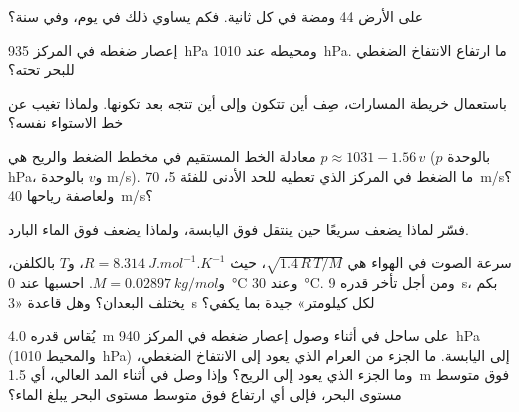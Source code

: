 \begin{exercise}[$\star\star$]\label{exo:g10:storms-and-cyclones:7}
على الأرض 44 ومضة  في كل ثانية. فكم يساوي ذلك في يوم، وفي
سنة؟
\end{exercise}

\begin{exercise}[$\star\star$]\label{exo:g10:storms-and-cyclones:8}
إعصار ضغطه في المركز \qty{935}{hPa} ومحيطه عند
\qty{1010}{hPa}. ما ارتفاع الانتفاخ الضغطي للبحر تحته؟
\end{exercise}

\begin{exercise}[$\star\star$]\label{exo:g10:storms-and-cyclones:9}
باستعمال خريطة المسارات، صِف أين تتكون  وإلى أين تتجه بعد
تكونها. ولماذا تغيب عن خط الاستواء نفسه؟
\end{exercise}

\begin{exercise}[$\star\star$]\label{exo:g10:storms-and-cyclones:10}
معادلة الخط المستقيم في مخطط الضغط والريح هي $p \approx 1031 - 1.56\,v$
($p$ بالوحدة \unit{hPa}، و$v$ بالوحدة \unit{m/s}). ما الضغط في المركز الذي تعطيه
للحد الأدنى للفئة 5، \qty{70}{m/s}؟ ولعاصفة رياحها
\qty{40}{m/s}؟
\end{exercise}

\begin{exercise}[$\star\star$]\label{exo:g10:storms-and-cyclones:11}
فسّر لماذا يضعف  سريعًا حين ينتقل فوق اليابسة، ولماذا يضعف فوق
الماء البارد.
\end{exercise}

\begin{exercise}[$\star\star\star$]\label{exo:g10:storms-and-cyclones:12}
سرعة الصوت في الهواء هي $\sqrt{1.4\,R\,T/M}$، حيث $R =
\qty{8.314}{J.mol^{-1}.K^{-1}}$، و$T$ بالكلفن، و$M =
\qty{0.02897}{kg/mol}$. احسبها عند \qty{0}{\degreeCelsius} وعند
\qty{30}{\degreeCelsius}. ومن أجل تأخر قدره \qty{9}{s}، بكم يختلف البعدان؟ وهل قاعدة
«\qty{3}{s} لكل كيلومتر» جيدة بما يكفي؟
\end{exercise}

\begin{exercise}[$\star\star\star$]\label{exo:g10:storms-and-cyclones:13}
يُقاس  قدره \qty{4.0}{m} على ساحل في أثناء وصول إعصار ضغطه في المركز
\qty{940}{hPa} (والمحيط \qty{1010}{hPa}) إلى اليابسة. ما الجزء من العرام الذي
يعود إلى الانتفاخ الضغطي، وما الجزء الذي يعود إلى الريح؟ وإذا وصل في أثناء المد
العالي، أي \qty{1.5}{m} فوق متوسط مستوى البحر، فإلى أي ارتفاع فوق متوسط مستوى البحر
يبلغ الماء؟
\end{exercise}

